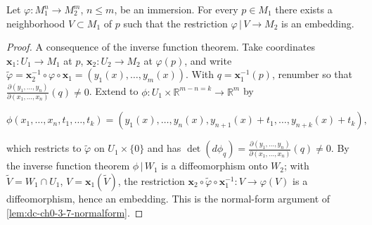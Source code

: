 \begin{proposition}
  \label{prop:dc-ch0-3-7}


  Let $\varphi:M_1^n\to M_2^m$, $n\le m$, be an immersion. For every $p\in M_1$
  there exists a neighborhood $V\subset M_1$ of $p$ such that the restriction
  $\varphi\,|\,V\to M_2$ is an embedding.
\end{proposition}
\begin{proof}
  \sketch

  A consequence of the inverse function theorem. Take coordinates
  $\mathbf{x}_1:U_1\to M_1$ at $p$, $\mathbf{x}_2:U_2\to M_2$ at $\varphi(p)$, and
  write $\tilde\varphi=\mathbf{x}_2^{-1}\circ\varphi\circ\mathbf{x}_1=(y_1(x),\dots,y_m(x))$.
  With $q=\mathbf{x}_1^{-1}(p)$, renumber so that
  $\frac{\partial(y_1,\dots,y_n)}{\partial(x_1,\dots,x_n)}(q)\neq0$. Extend to
  $\phi:U_1\times\mathbb{R}^{m-n=k}\to\mathbb{R}^m$ by

  $$
  \phi(x_1,\dots,x_n,t_1,\dots,t_k)=(y_1(x),\dots,y_n(x),y_{n+1}(x)+t_1,\dots,y_{n+k}(x)+t_k),
  $$

  which restricts to $\tilde\varphi$ on $U_1\times\{0\}$ and has
  $\det(d\phi_q)=\frac{\partial(y_1,\dots,y_n)}{\partial(x_1,\dots,x_n)}(q)\neq0$. By
  the inverse function theorem $\phi\,|\,W_1$ is a diffeomorphism onto $W_2$; with
  $\tilde V=W_1\cap U_1$, $V=\mathbf{x}_1(\tilde V)$, the restriction
  $\mathbf{x}_2\circ\tilde\varphi\circ\mathbf{x}_1^{-1}:V\to\varphi(V)$ is a
  diffeomorphism, hence an embedding. This is the normal-form argument of
  \cref{lem:dc-ch0-3-7-normalform}.

\end{proof}

